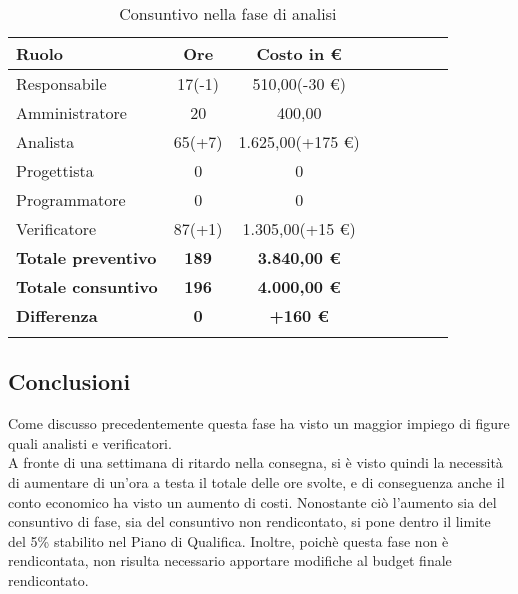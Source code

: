 \documentclass[../piano_di_progetto.tex]{subfiles}
\begin{document}
\begin{center}
	\begin{longtable}{|l|c|c|c|c|c|c|c|}
		\hline
		\rowcolor{lightgray}
		\textbf{Ruolo} & \textbf{Ore} & \textbf{Costo in €}\\
		\hline
		Responsabile & 17(-1) & 510,00(-30 €) \\
		\hline
		Amministratore & 20 & 400,00 \\
		\hline
		Analista & 65(+7) & 1.625,00(+175 €) \\
		\hline
		Progettista & 0 & 0 \\
		\hline
		Programmatore & 0 & 0 \\
		\hline
		Verificatore & 87(+1) & 1.305,00(+15 €) \\
		\hline
		\textbf{Totale preventivo} & \textbf{189} & \textbf{3.840,00 €} \\
		\hline
		\textbf{Totale consuntivo} & \textbf{196} & \textbf{4.000,00 €} \\
		\hline
		\textbf{Differenza} & \textbf{0} & \textbf{+160 €}\\
		\hline
		\rowcolor{white}
		\caption{Consuntivo nella fase di analisi}
	\end{longtable}
\end{center}

\subsection{ Conclusioni}%
\label{sub:cons_fine}
Come discusso precedentemente questa fase ha visto un maggior impiego di figure quali analisti e verificatori.\\
A fronte di una settimana di ritardo nella consegna, si è visto quindi la necessità di aumentare di un'ora a testa il totale delle ore svolte, e di conseguenza anche il conto economico ha visto un aumento di costi. Nonostante ciò l'aumento sia del consuntivo di fase, sia del consuntivo non rendicontato, si pone dentro il limite del 5\% stabilito nel Piano di Qualifica. Inoltre, poichè questa fase non è rendicontata, non risulta necessario apportare modifiche al budget finale rendicontato.
\end{document}
